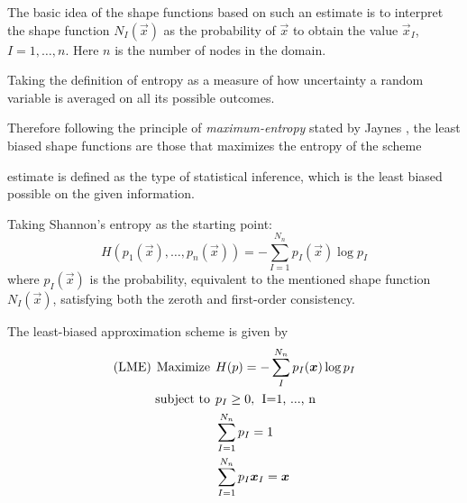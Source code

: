 The basic idea of the shape functions based on such
an estimate is to interpret the shape function $N_I(\vec{x})$ as the
probability of $\vec{x}$ to obtain the value $\vec{x}_I$,  $I=1,
\dots, n$. Here $n$ is the number of nodes in the domain.

Taking the definition of entropy as a measure of how uncertainty a
random variable is averaged on all its possible outcomes. 

Therefore following the principle of \textit{maximum-entropy}
stated by Jaynes \cite{Jaynes1957}, the least biased shape functions
are those that maximizes the entropy of the scheme

estimate is defined as the type of statistical
inference, which is the least biased possible on the given information.

Taking Shannon's entropy as the starting point:
\begin{equation}
  \label{eq:Shannon-entropy}
  H(p_1(\vec{x}),\ldots,p_n(\vec{x})) = -\sum^{N_n}_{I=1}{p_I(\vec{x})\log p_I }
\end{equation}
where $p_I(\vec{x})$ is the probability, equivalent to the mentioned
shape function $N_I(\vec{x})$,  satisfying both the zeroth and
first-order consistency.

The least-biased approximation scheme is given by
\begin{align*}
  \text{(LME)} \hspace{0.15cm} \text{Maximize} \hspace{0.15cm} &H(p) = -\sum_{I}^{N_n}{p_I(\vec{x})\log p_I } \nonumber \\
  \text{subject to} \hspace{0.15cm} &p_I \ge 0, \hspace{0.15cm} \text{I=1, ..., n} \nonumber \\
  &\sum_{I=1}^{N_n}{p_I} = 1 \nonumber \\
  &\sum_{I=1}^{N_n}{p_I \vec{x}_I} = \vec{x} \nonumber 
\end{align*}

